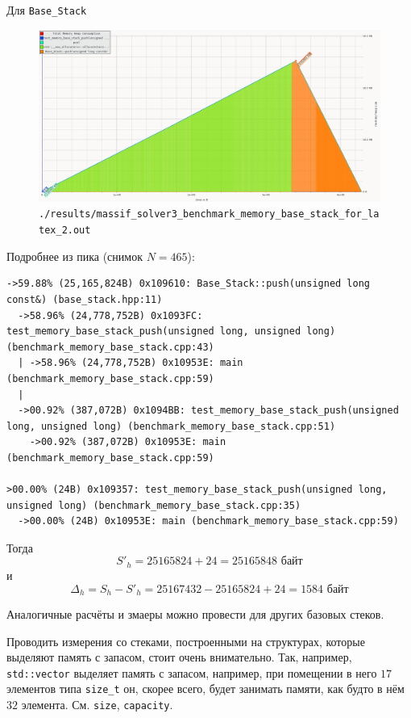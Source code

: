 Для \texttt{Base_Stack}
\begin{figure}[H]
  \centering
  \includegraphics[width=1.0\textwidth]{../../resources/memory_consumption_of_solver3_benchmark_memory_base_stack_with_list_2.png}
  \caption{\texttt{./results/massif_solver3_benchmark_memory_base_stack_for_latex_2.out}}
\end{figure}

Подробнее из пика (снимок \(N = 465\)):
\begin{lstlisting}[caption={}, label={}, style=style_code_block]
->59.88% (25,165,824B) 0x109610: Base_Stack::push(unsigned long const&) (base_stack.hpp:11)
  ->58.96% (24,778,752B) 0x1093FC: test_memory_base_stack_push(unsigned long, unsigned long) (benchmark_memory_base_stack.cpp:43)
  | ->58.96% (24,778,752B) 0x10953E: main (benchmark_memory_base_stack.cpp:59)
  |   
  ->00.92% (387,072B) 0x1094BB: test_memory_base_stack_push(unsigned long, unsigned long) (benchmark_memory_base_stack.cpp:51)
    ->00.92% (387,072B) 0x10953E: main (benchmark_memory_base_stack.cpp:59)

>00.00% (24B) 0x109357: test_memory_base_stack_push(unsigned long, unsigned long) (benchmark_memory_base_stack.cpp:35)
  ->00.00% (24B) 0x10953E: main (benchmark_memory_base_stack.cpp:59)
\end{lstlisting}
Тогда 
\begin{dmath*}
  S'_h = 25165824 + 24 = 25165848 \text{ байт}
\end{dmath*}
и 
\begin{dmath*}
  \Delta_h = S_h - S'_h =  25167432 - 25165824 + 24 = 1584 \text{ байт}
\end{dmath*}


Аналогичные расчёты и змаеры можно провести для других базовых стеков. 
\begin{mdframed}[style=mdfStyleCode]%
  \begin{remark}\rm%
    Проводить измерения со стеками, построенными на структурах, которые выделяют память с запасом, стоит очень внимательно. Так, например, \texttt{std::vector} выделяет память с запасом, например, при помещении в него \(17\) элементов типа \texttt{size_t} он, скорее всего, будет занимать памяти, как будто в нём \(32\) элемента. См. \texttt{size}, \texttt{capacity}.
\end{remark}
\end{mdframed}


